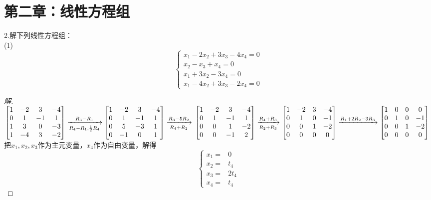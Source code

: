 \documentclass[10pt,a4paper]{report}
\title{}
\author{}
\date{}
\begin{document}
\chapter*{第二章：线性方程组}
\noindent 2.解下列线性方程组：\\
\noindent (1)
$$
\left\{
\begin{aligned}
x_{1}-2x_{2}+3x_{3}-4x_{4}=0 \\
x_{2}-x_{3}+x_{4}=0 \\
x_{1}+3x_{2}-3x_{4}=0 \\
x_{1}-4x_{2}+3x_{3}-2x_{4}=0
\end{aligned}
\right.
$$
\begin{proof}[解]
	$
	\left[
	\begin{matrix}
	1 & -2 & 3 & -4\\
	0 & 1 & -1 & 1\\
	1 & 3 & 0 & -3 \\
	1 & -4 & 3 & -2
	\end{matrix}
	\right] \xrightarrow[R_{4}-R_{1};\frac{1}{2}R_{4}]{R_{3} -R_{1}} \left[
	\begin{matrix}
	1 & -2 & 3 & -4\\
	0 & 1 & -1 & 1\\
	0 & 5 & -3 & 1\\
	0 & -1 & 0 & 1
	\end{matrix}
	\right] \xrightarrow[R_{4}+R_{2}]{R_{3}-5R_{2}} \\
	\left[
	\begin{matrix}
	1 & -2 & 3 & -4\\
	0 & 1 & -1 & 1\\
	0 & 0 & 1 & -2\\
	0 & 0 & -1 & 2
	\end{matrix}
	\right] \xrightarrow[R_{2}+R_{3}]{R_{4}+R_{3}} \left[
	\begin{matrix}
	1 & -2 & 3 & -4\\
	0 & 1 & 0 & -1\\
	0 & 0 & 1 & -2\\
	0 & 0 & 0 & 0
	\end{matrix}
	\right] \xrightarrow{R_{1}+2R_{2}-3R_{3}} \left[
	\begin{matrix}
	1 & 0 & 0 & 0\\
	0 & 1 & 0 & -1\\
	0 & 0 & 1 & -2\\
	0 & 0 & 0 & 0
	\end{matrix}
	\right]
	$
	把$x_{1},x_{2},x_{3}$作为主元变量，$x_{4}$作为自由变量，解得
	$$
	\left\{
	\begin{aligned}
	x_{1} = & 0 \\
	x_{2} = & t_{4} \\
	x_{3} = & 2t_{4} \\
	x_{4} = & t_{4}
	\end{aligned}
	\right.
	$$
\end{proof}
\end{document}

